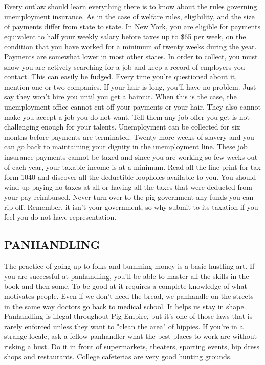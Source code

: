 \documentclass[11pt,twoside,a4paper]{book}
\begin{document}
Every outlaw should learn everything there is to know about the rules governing unemployment insurance. As in the case of welfare rules, eligibility, and the size of payments differ from state to state. In New York, you are eligible for payments equivalent to half your weekly salary before taxes up to \$65 per week, on the condition that you have worked for a minimum of twenty weeks during the year. Payments are somewhat lower in most other states. In order to collect, you must show you are actively searching for a job and keep a record of employers you contact. This can easily be fudged. Every time you're questioned about it, mention one or two companies. If your hair is long, you'll have no problem. Just say they won't hire you until you get a haircut. When this is the case, the unemployment office cannot cut off your payments or your hair. They also cannot make you accept a job you do not want. Tell them any job offer you get is not challenging enough for your talents. Unemployment can be collected for six months before payments are terminated. Twenty more weeks of slavery and you can go back to maintaining your dignity in the unemployment line. These job insurance payments cannot be taxed and since you are working so few weeks out of each year, your taxable income is at a minimum. Read all the fine print for tax form 1040 and discover all the deductible loopholes available to you. You should wind up paying no taxes at all or having all the taxes that were deducted from your pay reimbursed. Never turn over to the pig government any funds you can rip off. Remember, it isn't your government, so why submit to its taxation if you feel you do not have representation.

\subsection{PANHANDLING}

The practice of going up to folks and bumming money is a basic hustling art. If you are successful at panhandling, you'll be able to master all the skills in the book and then some. To be good at it requires a complete knowledge of what motivates people. Even if we don't need the bread, we panhandle on the streets in the same way doctors go back to medical school. It helps us stay in shape. Panhandling is illegal throughout Pig Empire, but it's one of those laws that is rarely enforced unless they want to "clean the area" of hippies. If you're in a strange locale, ask a fellow panhandler what the best places to work are without risking a bust. Do it in front of supermarkets, theaters, sporting events, hip dress shops and restaurants. College cafeterias are very good hunting grounds.~\\
\end{document}
